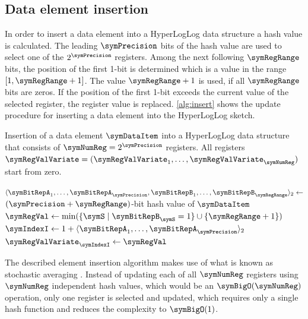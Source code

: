 \documentclass[a4paper]{scrartcl}
\newcommand{\comm}[2]{{\Comment{\parbox[t]{#1\linewidth}{{#2}}}}}
\begin{document}
\subsection{Data element insertion}
\label{sec:data_element_insertion}
In order to insert a data element into a HyperLogLog data structure a hash value is calculated. The leading $\symPrecision$ bits of the hash value are used to select one of the $2^\symPrecision$ registers. Among the next following $\symRegRange$ bits, the position of the first 1-bit is determined which is a value in the range $[1,\symRegRange+1]$. The value $\symRegRange+1$ is used, if all $\symRegRange$ bits are zeros. If the position of the first 1-bit exceeds the current value of the selected register, the register value is replaced. \cref{alg:insert} shows the update procedure for inserting a data element into the HyperLogLog sketch.

\begin{algorithm}
\caption{Insertion of a data element $\symDataItem$ into a HyperLogLog data structure that consists of $\symNumReg=2^\symPrecision$ registers. All registers $\boldsymbol{\symRegValVariate} = (\symRegValVariate_1,\ldots,\symRegValVariate_\symNumReg)$ start from zero.}
\label{alg:insert}
\begin{algorithmic}
\State $\langle \symBitRepA_1, \ldots, \symBitRepA_\symPrecision,\symBitRepB_1,\ldots,\symBitRepB_\symRegRange\rangle_2 \gets$ $(\symPrecision + \symRegRange)$-bit hash value of $\symDataItem$
\comm{0.25}{$\symBitRepA_\symIndexI,\symBitRepB_\symIndexI\in\{0,1\}$}
\State $\symRegVal \gets \min(\{\symS\mid \symBitRepB_\symS = 1\}\cup {\{\symRegRange+1\}} )$
\comm{0.25}{$\symRegVal\in\lbrace 1,2,\ldots,\symRegRange+1\rbrace$}
\State $\symIndexI \gets 1+ \langle \symBitRepA_1, \ldots, \symBitRepA_\symPrecision\rangle_2$
\comm{0.25}{$\symIndexI\in\lbrace 1,2,\ldots,2^\symPrecision\rbrace$}
\If{$\symRegVal>\symRegValVariate_\symIndexI$}
\State $\symRegValVariate_\symIndexI \gets\symRegVal$
\EndIf
\EndProcedure
\end{algorithmic}
\end{algorithm}

The described element insertion algorithm makes use of what is known as stochastic averaging \cite{Flajolet1985}. Instead of updating each of all $\symNumReg$ registers using $\symNumReg$ independent hash values, which would be an $\symBigO(\symNumReg)$ operation, only one register is selected and updated, which requires only a single hash function and reduces the complexity to $\symBigO(1)$.
\end{document}
